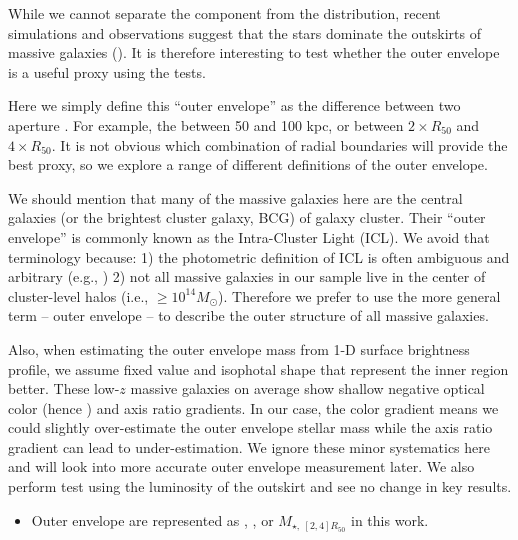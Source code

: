\documentclass[fleqn,usenatbib,useAMS,english]{mnras}
\begin{document}
    While we cannot separate the \exsitu{} component from the \mstar{} distribution,
    recent simulations and observations suggest that the \exsitu{} stars dominate the
    outskirts of massive galaxies (\addref{}).
    It is therefore interesting to test whether the outer envelope \mstar{} is a useful \mvir{}
    proxy using the \topn{} tests.

    Here we simply define this ``outer envelope'' \mstar{} as the difference between
    two aperture \mstar{}.
    For example, the \mstar{} between 50 and 100 kpc, or between $2 \times R_{50}$ and
    $4 \times R_{50}$.
    It is not obvious which combination of radial boundaries will provide the best
    \exsitu{} \mstar{} proxy, so we explore a range of different definitions of the
    outer envelope.

    We should mention that many of the massive galaxies here are the central galaxies
    (or the brightest cluster galaxy, BCG) of galaxy cluster. 
    Their ``outer envelope'' is commonly known as the Intra-Cluster Light (ICL).
    We avoid that terminology because:
    1) the photometric definition of ICL is often ambiguous and arbitrary (e.g.,
    \citealt{Kluge2021})
    2) not all massive galaxies in our sample live in the
    center of cluster-level halos (i.e., \mvir{}$\geq 10^{14} M_{\odot}$).
    Therefore we prefer to use the more general term -- outer envelope -- to describe the
    outer structure of all massive galaxies.
    
    Also, when estimating the outer envelope mass from 1-D surface brightness profile,
    we assume fixed \mlratio{} value and isophotal shape that represent the inner region
    better.
    These low-$z$ massive galaxies on average show shallow negative optical color
    (hence \mlratio{}) and axis ratio gradients. 
    In our case, the color gradient means we could slightly over-estimate the outer envelope
    stellar mass while the axis ratio gradient can lead to under-estimation.
    We ignore these minor systematics here and will look into more accurate outer envelope 
    \mstar{} measurement later.
    We also perform \topn{} test using the luminosity of the outskirt and see no 
    change in key results.

    \begin{itemize}
        \item Outer envelope \mstar{} are represented as , , or
        $M_{\star,\ [2,4]R_{50}}$ in this work.

    \end{itemize}
\end{document}
